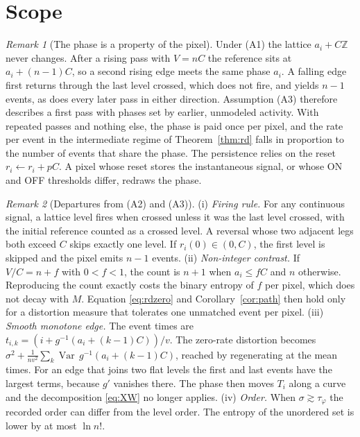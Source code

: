 \documentclass[10pt]{article}
\theoremstyle{remark}
\newtheorem{remark}{Remark}
\newcommand{\tphi}{\tau_\varphi}
\begin{document}
\section{Scope}
\begin{remark}[The phase is a property of the pixel]\label{rem:persist}
Under (A1) the lattice $a_i+C\mathbb Z$ never changes. After a rising pass with $V=nC$ the
reference sits at $a_i+(n-1)C$, so a second rising edge meets the same phase $a_i$. A falling edge
first returns through the last level crossed, which does not fire, and yields $n-1$ events, as does every
later pass in either direction. Assumption (A3) therefore describes a first
pass with phases set by earlier, unmodeled activity. With repeated passes and nothing else, the
phase is paid once per pixel, and the rate per event in the intermediate regime of
Theorem~\ref{thm:rd} falls in proportion to the number of events that share the phase. The
persistence relies on the reset $r_i\leftarrow r_i+pC$. A pixel whose reset stores the instantaneous
signal, or whose ON and OFF thresholds differ, redraws the phase.
\end{remark}
\begin{remark}[Departures from (A2) and (A3)]\label{rem:relax}
(i) \emph{Firing rule.} For any continuous signal, a lattice level fires when crossed unless it was
the last level crossed, with the initial reference counted as a crossed level. A reversal whose two adjacent legs both exceed $C$ skips exactly one level.
If $r_i(0)\in(0,C)$, the first level is skipped and the pixel emits $n-1$ events.
(ii) \emph{Non-integer contrast.} If $V/C=n+f$ with $0<f<1$, the count is $n+1$ when $a_i\le fC$ and
$n$ otherwise. Reproducing the count exactly costs the binary entropy of $f$ per pixel, which does
not decay with $M$. Equation \eqref{eq:rdzero} and Corollary~\ref{cor:path} then hold only for a
distortion measure that tolerates one unmatched event per pixel.
(iii) \emph{Smooth monotone edge.} The event times are $t_{i,k}=(i+g^{-1}(a_i+(k-1)C))/v$. The
zero-rate distortion becomes $\sigma^2+\tfrac1{nv^2}\sum_k\operatorname{Var}\,g^{-1}(a_i+(k-1)C)$,
reached by regenerating at the mean times. For an edge that joins two flat levels the first and
last events have the largest terms, because $g'$ vanishes there. The phase then moves $T_i$ along a
curve and the decomposition \eqref{eq:XW} no longer applies.
(iv) \emph{Order.} When $\sigma\gtrsim\tphi$ the recorded order can differ from the level order.
The entropy of the unordered set is lower by at most $\ln n!$.
\end{remark}
\end{document}
